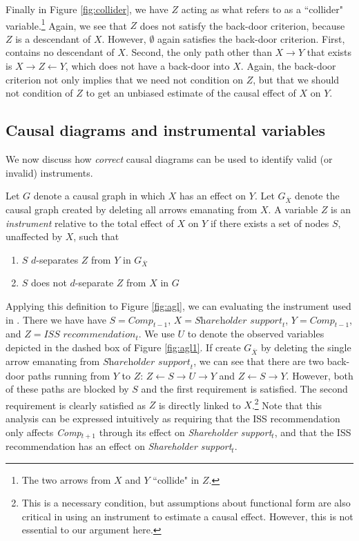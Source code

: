 \documentclass[12pt,reqno,titlepage]{amsart}
\begin{document}
Finally in Figure \ref{fig:collider}, we have $Z$ acting as what \citet[p.\,17]{Pearl:2009kh} refers to as a ``collider" variable.\footnote{
The two arrows from $X$ and $Y$ ``collide" in $Z$.} 
Again, we see that $Z$ does not satisfy the back-door criterion, because $Z$ is a descendant of $X$.
However, $\emptyset$ again satisfies the back-door criterion.
First, contains no descendant of $X$.
Second, the only path other than $X \rightarrow Y$ that exists is $X \rightarrow Z \leftarrow Y$, which does not have a back-door into $X$.
Again, the back-door criterion not only implies that we need not condition on $Z$, but that we should not condition of $Z$ to get an unbiased estimate of the causal effect of $X$ on $Y$.

\subsection{Causal diagrams and instrumental variables}

We now discuss how \emph{correct} causal diagrams can be used to identify valid (or invalid) instruments.
 

\begin{definition}[Instrument]
Let $G$ denote a causal graph in which $X$ has an effect on $Y$. 
Let $G_{\overline{X}}$ denote the causal graph created by deleting all arrows emanating from $X$.
A variable $Z$ is an \emph{instrument} relative to the total effect of $X$ on $Y$ if there exists a set of nodes $S$, unaffected by $X$, such that
\begin{enumerate}
\item $S$ $d$-separates $Z$ from $Y$ in $G_{\overline{X}}$
\item $S$ does not $d$-separate $Z$ from $X$ in $G$
\end{enumerate}
\end{definition}

Applying this definition to Figure \ref{fig:agl}, we can evaluating the instrument used in \citet{Armstrong:2013io}.
There we have have $S = \textit{Comp}_{t-1}$,
$X =\textit{Shareholder support}_{t}$, $Y = \textit{Comp}_{t-1}$, and $Z = \textit{ISS recommendation}_{t}$.
We use $U$ to denote the observed variables depicted in the dashed box of Figure \ref{fig:agl1}.
If create $G_{\overline{X}}$ by deleting the single arrow emanating from $\textit{Shareholder support}_{t}$, we can see that there are two back-door paths running from $Y$ to $Z$: 
$Z \leftarrow S \rightarrow U \rightarrow Y$ and $Z \leftarrow S \rightarrow Y$.
However, both of these paths are blocked by $S$ and the first requirement is satisfied.
The second requirement is clearly satisfied as $Z$ is directly linked to $X$.\footnote{
This is a necessary condition, but assumptions about functional form are also critical in using an instrument to estimate a causal effect.
However, this is not essential to our argument here.}
%
Note that this analysis can be expressed intuitively as requiring that the ISS recommendation only affects \textit{Comp}$_{t+1}$ through its effect on \textit{Shareholder support}$_{t}$, and that the ISS recommendation has an effect on \textit{Shareholder support}$_{t}$.
\end{document}
